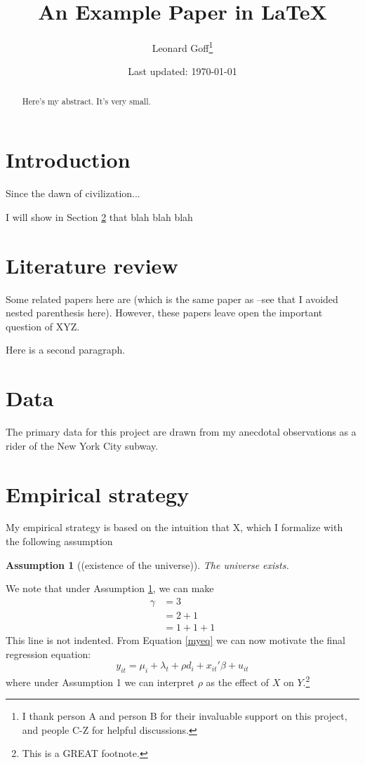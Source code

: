 \documentclass{article}
\title{An Example Paper in \LaTeX}
\author{Leonard Goff\thanks{I thank person A and person B for their invaluable support on this project, and people C-Z for helpful discussions.}}
\date{Last updated: \today}
\newtheorem{assumption}{Assumption}
\begin{document}
\maketitle

\begin{abstract}
Here's my abstract. It's very small.
\end{abstract}

\large


\section{Introduction} \label{secintro}
Since the dawn of civilization...

I will show in Section \ref{seclit} that blah blah blah

\section{Literature review} \label{seclit}

Some related papers here are \cite{Wilson2025} (which is the same paper as \citealt{Wilson2025}--see that I avoided nested parenthesis here). However, these papers leave open the important question of XYZ.

Here is a second paragraph.

\section{Data}
The primary data for this project are drawn from my anecdotal observations as a rider of the New York City subway.

\section{Empirical strategy}
My empirical strategy is based on the intuition that X, which I formalize with the following assumption
\begin{assumption}[(existence of the universe)] \label{idassumption}
	The universe exists.
\end{assumption}
\noindent We note that under Assumption \ref{idassumption}, we can make
\begin{align}
\gamma &= 3 \nonumber \\
	&= 2+1 \nonumber \\
	&= 1+1+1 \label{myeq}
\end{align}
\noindent This line is not indented. From Equation \ref{myeq} we can now motivate the final regression equation:
$$ y_{it} = \mu_i + \lambda_t + \rho d_i+ x_{it}'\beta + u_{it}$$
where under Assumption 1 we can interpret $\rho$ as the effect of $X$ on $Y$.\footnote{This is a GREAT footnote.}
\end{document}
